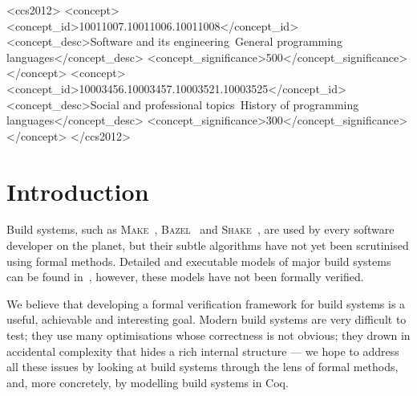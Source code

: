 \documentclass[sigplan,review]{acmart}\settopmatter{printfolios=true,printccs=false,printacmref=false}
\newcommand{\Bazel}{\textsc{Bazel}\xspace}
\newcommand{\Make}{\textsc{Make}\xspace}
\newcommand{\Shake}{\textsc{Shake}\xspace}
\begin{document}
\begin{CCSXML}
<ccs2012>
<concept>
<concept_id>10011007.10011006.10011008</concept_id>
<concept_desc>Software and its engineering~General programming languages</concept_desc>
<concept_significance>500</concept_significance>
</concept>
<concept>
<concept_id>10003456.10003457.10003521.10003525</concept_id>
<concept_desc>Social and professional topics~History of programming languages</concept_desc>
<concept_significance>300</concept_significance>
</concept>
</ccs2012>
\end{CCSXML}




\maketitle


\section{Introduction}

Build systems, such as \Make~\cite{feldman1979make},
\Bazel~\cite{bazel} and \Shake~\cite{mitchell2012shake}, are used by every
software developer on the planet, but their subtle algorithms have not yet been
scrutinised using formal methods. Detailed and executable models of major build
systems can be found in~\cite{Mokhov2018icfp}, however, these models have not
been formally verified.

We believe that developing a formal verification framework for build systems
is a useful, achievable and interesting goal. Modern build systems are
very difficult to test; they use many optimisations whose correctness is not
obvious; they drown in accidental complexity that hides a rich internal
structure --- we hope to address all these issues by looking at build systems
through the lens of formal methods, and, more concretely, by modelling build
systems in Coq.
\end{document}

